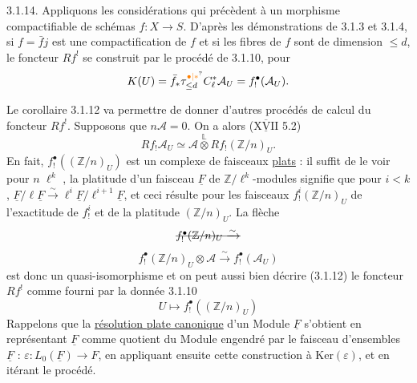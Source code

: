3.1.14. Appliquons les considérations qui précèdent à un morphisme compactifiable de schémas $f:X\longrightarrow S$.
D'après les démonstrations de 3.1.3 et 3.1.4, si $f=\bar f j$ est une compactification de $f$ et si les fibres de $f$ sont de dimension $\leq d$, le foncteur $Rf^!$ se construit par le procédé de 3.1.10, pour
\[
 K(U)=\bar f_*\tau^{\unsure{\bullet|*}}_{\leq d}C^{*}_{\ell}\mathcal A_U=f_!^\bullet(\mathcal A_U).
\]

Le corollaire 3.1.12 va permettre de donner d'autres procédés de calcul\unsure{/} du foncteur $Rf^!$. Supposons que $n\mathcal A=0$. On a alors ($\overline{\underline{\mathrm{XVII}}}$ 5.2)
\[
 Rf_!\mathcal A_U\simeq\mathcal A\overset{\mathbb L}{\otimes}Rf_!(\mathbb Z/n)_U.
\]
En fait, $f_!^\bullet((\mathbb Z/n)_U)$ est un complexe de faisceaux \uline{plats} : il suffit de le voir pour $n$\deleted{$=$} $\ell^k$ ,  la platitude  d'un faisceau $\underline F$  de $\mathbb Z/\ell^k$-modules signifie que pour $i<k$, $\underline F/\ell\underline F\xrightarrow{\sim}\ell^i\underline F/\ell^{i+1}\underline F$, et ceci résulte pour les faisceaux $f_!^i(\mathbb Z/n)_U$ de l'exactitude de $f_!^i$ et de la platitude  $(\mathbb Z/n)_U$.
 La flèche 
\[
 \deleted{f_!^\bullet(\mathbb Z/n)_U\xrightarrow{\sim}}
\]
\[
 f_!^\bullet(\mathbb Z/n)_U\otimes\mathcal A\xrightarrow{\sim}f_!^\bullet(\mathcal A_U)
\]
est donc un quasi-isomorphisme et on peut aussi bien décrire (3.1.12)
le foncteur $Rf^!$ comme fourni par la  donnée 3.1.10
\[
 U\longmapsto f_!^\bullet((\mathbb Z/n)_U)
\]
Rappelons que la \uline{résolution plate canonique}  d'un Module $\underline F$ s'obtient en représentant $\underline F$ comme quotient du Module engendré par le faisceau d'ensembles $\underline F$ : $\varepsilon:L_0(\underline F)\longrightarrow F$, en appliquant ensuite cette construction à $\mathrm{Ker}(\varepsilon)$, et en itérant le procédé.

